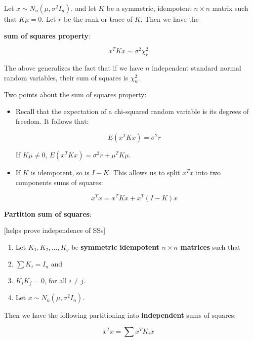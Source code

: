 Let $x\sim N_n(\mu,\sigma^2 I_n)$, and let $K$ be a symmetric, idempotent $n \times n$ matrix such that $K\mu=0$. Let $r$ be the rank or trace of $K$. Then we have the 

\begin{fmpage}{\linewidth}
\textbf{sum of squares property}:

\begin{equation}
x^T K x \sim \sigma^2 \chi_r^2
\end{equation}
\end{fmpage}

The above generalizes the fact that if we have $n$ independent standard normal random variables, their sum of squares is $\chi_n^2$.

Two points about the sum of squares property:
\begin{itemize}
\item
Recall that the expectation of a chi-squared random variable is its degrees of freedom. It follows that:

\begin{equation}
E(x^T K x) =  \sigma^2 r 
\end{equation}

If $K\mu\neq 0$, $E(x^T K x) =  \sigma^2 r+\mu^T K\mu$. 

\item If $K$ is idempotent, so is $I-K$. This allows us to split $x^T x$ into two components sums of squares:

\begin{equation}
x^T x = x^T K x+x^T (I-K) x
\end{equation}
\end{itemize}

\textbf{Partition sum of squares}:

[helps prove independence of SSs] 

\begin{enumerate}
\item Let $K_1, K_2,\dots, K_q$ be \textbf{symmetric idempotent $n \times n$ matrices} such that
\item $\sum K_i= I_n$ and 
\item $K_iK_j =0$, for all $i\neq j $. 
\item Let $x\sim N_n(\mu, \sigma^2I_n)$.
 \end{enumerate}
 
 Then we have the following partitioning into \textbf{independent} sums of squares:
 
  \begin{equation}
x^T x = \sum x^T K_i x
\end{equation}

